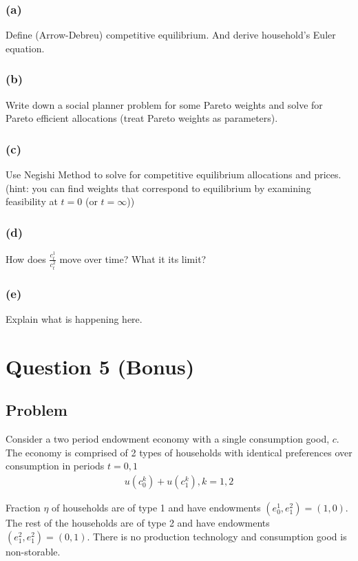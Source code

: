 \documentclass[10pt, a4paper]{article}
\begin{document}
\subsubsection*{(a)}
Define (Arrow-Debreu) competitive equilibrium. And derive household's Euler equation.

\subsubsection*{(b)}
Write down a social planner problem for some Pareto weights and solve for Pareto efficient allocations (treat Pareto weights as parameters).

\subsubsection*{(c)}
Use Negishi Method to solve for competitive equilibrium allocations and prices. (hint: you can find weights that correspond to equilibrium by examining feasibility at $t = 0$ (or $t = \infty$))

\subsubsection*{(d)}
How does $\frac{c^1_t}{c^2_t}$ move over time? What it its limit?

\subsubsection*{(e)}
Explain what is happening here.

\section*{Question 5 (Bonus)}
\subsection*{Problem}
Consider a two period endowment economy with a single consumption good, $c$. The economy is comprised of 2 types of households with identical preferences over consumption in periods $t = 0,1$
\begin{gather*}
  u(c^k_0) + u(c^k_1), k = 1,2
\end{gather*}

Fraction $\eta$ of households are of type 1 and have endowments $(e^1_0, e^2_1) = (1,0)$. The rest of the households are of type 2 and have endowments $(e^2_1, e^2_1) = (0,1)$. There is no production technology and consumption good is non-storable.
\end{document}
